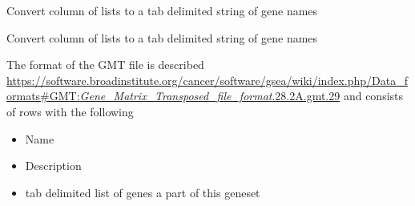 \documentclass[
]{book}
\newenvironment{Shaded}{\begin{snugshade}}{\end{snugshade}}
\newcommand{\AttributeTok}[1]{\textcolor[rgb]{0.13,0.29,0.53}{#1}}
\newcommand{\ControlFlowTok}[1]{\textcolor[rgb]{0.13,0.29,0.53}{\textbf{#1}}}
\newcommand{\DecValTok}[1]{\textcolor[rgb]{0.00,0.00,0.81}{#1}}
\newcommand{\FunctionTok}[1]{\textcolor[rgb]{0.13,0.29,0.53}{\textbf{#1}}}
\newcommand{\NormalTok}[1]{#1}
\newcommand{\OtherTok}[1]{\textcolor[rgb]{0.56,0.35,0.01}{#1}}
\newcommand{\SpecialCharTok}[1]{\textcolor[rgb]{0.81,0.36,0.00}{\textbf{#1}}}
\newcommand{\StringTok}[1]{\textcolor[rgb]{0.31,0.60,0.02}{#1}}
\providecommand{\tightlist}{%
  \setlength{\itemsep}{0pt}\setlength{\parskip}{0pt}}
\begin{document}
Convert column of lists to a tab delimited string of gene names

\begin{Shaded}
\end{Shaded}

Convert column of lists to a tab delimited string of gene names

\begin{Shaded}
\end{Shaded}

The format of the GMT file is described \href{here}{https://software.broadinstitute.org/cancer/software/gsea/wiki/index.php/Data\_formats\#GMT:\emph{Gene\_Matrix\_Transposed\_file\_format}.28.2A.gmt.29} and consists of rows with the following

\begin{itemize}
\tightlist
\item
  Name
\item
  Description
\item
  tab delimited list of genes a part of this geneset
\end{itemize}
\end{document}

